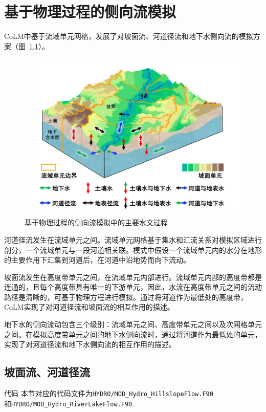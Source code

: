 \chapter{基于物理过程的侧向流模拟}

CoLM中基于流域单元网格，发展了对坡面流、河道径流和地下水侧向流的模拟方案（图~\ref{fig:主要水文过程}）。

{
\begin{figure}[htbp]
\centering
\includegraphics[width=\textwidth]{Figures/侧向流/主要水文过程.jpg}
\caption{基于物理过程的侧向流模拟中的主要水文过程}
\label{fig:主要水文过程}
\end{figure}
}

河道径流发生在流域单元之间。流域单元网格基于集水和汇流关系对模拟区域进行剖分，一个流域单元与一段河道相关联。模式中假设一个流域单元内的水分在地形的主要作用下汇集到河道后，在河道中沿地势而向下流动。

坡面流发生在高度带单元之间，在流域单元内部进行。流域单元内部的高度带都是连通的，且每个高度带具有唯一的下游单元，因此，水流在高度带单元之间的流动路径是清晰的，可基于物理方程进行模拟。通过将河道作为最低处的高度带，CoLM实现了对河道径流和坡面流的相互作用的描述。

地下水的侧向流动包含三个级别：流域单元之间、高度带单元之间以及次网格单元之间。在模拟高度带单元之间的地下水侧向流时，通过将河道作为最低处的单元，实现了对河道径流和地下水侧向流的相互作用的描述。

\section{坡面流、河道径流}

\begin{mymdframed}{代码}
本节对应的代码文件为\texttt{HYDRO/MOD\_Hydro\_HillslopeFlow.F90} \\
和\texttt{HYDRO/MOD\_Hydro\_RiverLakeFlow.F90}.
\end{mymdframed}


